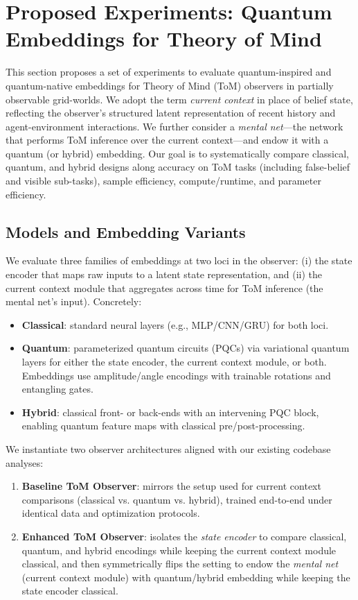 \section{Proposed Experiments: Quantum Embeddings for Theory of Mind}
\label{sec:experiments}

This section proposes a set of experiments to evaluate quantum-inspired and quantum-native embeddings for Theory of Mind (ToM) observers in partially observable grid-worlds. We adopt the term \emph{current context} in place of belief state, reflecting the observer's structured latent representation of recent history and agent-environment interactions. We further consider a \emph{mental net}---the network that performs ToM inference over the current context---and endow it with a quantum (or hybrid) embedding. Our goal is to systematically compare classical, quantum, and hybrid designs along accuracy on ToM tasks (including false-belief and visible sub-tasks), sample efficiency, compute/runtime, and parameter efficiency.

\subsection{Models and Embedding Variants}
We evaluate three families of embeddings at two loci in the observer: (i) the state encoder that maps raw inputs to a latent state representation, and (ii) the current context module that aggregates across time for ToM inference (the mental net's input). Concretely:
\begin{itemize}
  \item \textbf{Classical}: standard neural layers (e.g., MLP/CNN/GRU) for both loci.
  \item \textbf{Quantum}: parameterized quantum circuits (PQCs) via variational quantum layers for either the state encoder, the current context module, or both. Embeddings use amplitude/angle encodings with trainable rotations and entangling gates.
  \item \textbf{Hybrid}: classical front- or back-ends with an intervening PQC block, enabling quantum feature maps with classical pre/post-processing.
\end{itemize}

We instantiate two observer architectures aligned with our existing codebase analyses:
\begin{enumerate}
  \item \textbf{Baseline ToM Observer}: mirrors the setup used for current context comparisons (classical vs. quantum vs. hybrid), trained end-to-end under identical data and optimization protocols.
  \item \textbf{Enhanced ToM Observer}: isolates the \emph{state encoder} to compare classical, quantum, and hybrid encodings while keeping the current context module classical, and then symmetrically flips the setting to endow the \emph{mental net} (current context module) with quantum/hybrid embedding while keeping the state encoder classical.
\end{enumerate}

